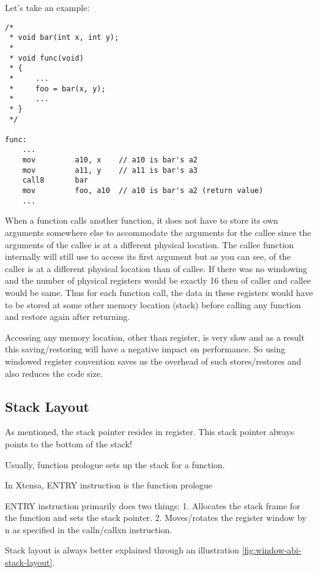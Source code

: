 Let’s take an example:

\begin{verbatim}
/*
 * void bar(int x, int y);
 *
 * void func(void)
 * {
 *     ...
 *     foo = bar(x, y);
 *     ...
 * }
 */

func:
    ...
    mov         a10, x    // a10 is bar's a2
    mov         a11, y    // a11 is bar's a3
    call8       bar
    mov         foo, a10  // a10 is bar's a2 (return value)
    ...
\end{verbatim}

 When a function calls another function, it does not have to store its own arguments somewhere else to accommodate the arguments for the callee since the arguments of the callee is at a different physical location. The callee function internally will still use  to access its first argument but as you can see,  of the caller is at a different physical location than  of callee. If there was no windowing and the number of physical registers would be exactly 16 then  of caller and callee would be same. Thus for each function call, the data in these registers would have to be stored at some other memory location (stack) before calling any function and restore again after returning.

Accessing any memory location, other than register, is very slow and as a result this saving/restoring will have a negative impact on performance. So using windowed register convention saves us the overhead of such stores/restores and also reduces the code size.

\subsection{Stack Layout}

As mentioned, the stack pointer resides in  register. This stack pointer always points to the bottom of the stack!

Usually, function prologue sets up the stack for a function.

In Xtensa, ENTRY instruction is the function prologue

ENTRY instruction primarily does two things:
1. Allocates the stack frame for the function and sets the stack pointer.
2. Moves/rotates the register window by n as specified in the calln/callxn instruction.

Stack layout is always better explained through an illustration \ref{fig:window-abi-stack-layout}.

